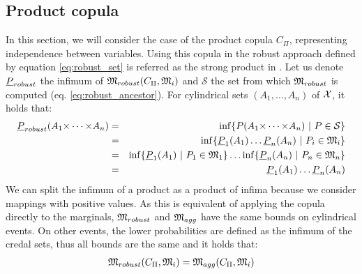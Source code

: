 \subsection{Product copula}\label{subsection:product_copula}
In this section, we will consider the case of the product copula $C_\Pi$, representing independence between variables. Using this copula in the robust approach defined by equation \eqref{eq:robust_set} is referred as the strong product in \cite{kacprzyk_factorisation_2010}. Let us denote ${\underline{P}}_{robust}$ the infimum of ${\mathfrak{M}}_{robust}(C_\Pi, {\mathfrak{M}}_i)$ and $\mathcal{S}$ the set from which ${\mathfrak{M}}_{robust}$ is computed (eq. \eqref{eq:robust_ancestor}).
For cylindrical sets $(A_1, \dots, A_n)$ of ${\mathcal{X}}$, it holds that:
\begin{eqnarray*}
    {\underline{P}}_{robust}(A_1{\times\dots\times} A_n) &=& \inf\{P(A_1{\times\dots\times} A_n)~|~P\in\mathcal{S}\}\\
    &=&\inf\{{\underline{P}}_1(A_1)\dots{\underline{P}}_n(A_n)~|~P_i\in{\mathfrak{M}}_i\}\\
    &=&\inf\{{\underline{P}}_1(A_1)~|~P_1\in{\mathfrak{M}}_1\}\dots\inf\{{\underline{P}}_n(A_n)~|~P_n\in{\mathfrak{M}}_n\}\\
    &=&{\underline{P}}_1(A_1)\dots{\underline{P}}_n(A_n)
\end{eqnarray*}
We can split the infimum of a product as a product of infima because we consider mappings with positive values. As this is equivalent of applying the copula directly to the marginals, ${\mathfrak{M}}_{robust}$ and ${\mathfrak{M}}_{agg}$ have the same bounds on cylindrical events. On other events, the lower probabilities are defined as the infimum of the credal sets, thus all bounds are the same and it holds that:
\begin{eqnarray}
    {\mathfrak{M}}_{robust}(C_\Pi, {\mathfrak{M}}_i)={\mathfrak{M}}_{agg}(C_\Pi, {\mathfrak{M}}_i)
\end{eqnarray}


